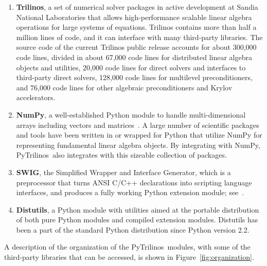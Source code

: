 \documentclass[acmtocl]{acmtrans2m}
\newcommand{\PyTrilinos}{{PyTrilinos}}
\begin{document}
\begin{enumerate}

\item {\bf Trilinos}, a set of numerical solver packages in active
  development at Sandia National Laboratories that allows
  high-performance scalable linear algebra operations for large
  systems of equations.  Trilinos contains more than half a million
  lines of code, and it can interface with many third-party libraries.  The
  source code of the current Trilinos public release accounts for
  about 300,000 code lines, divided in about 67,000 code lines for
  distributed linear algebra objects and utilities, 20,000 code lines
  for direct solvers and interfaces to third-party direct solvers,
  128,000 code lines for multilevel preconditioners, and 76,000 code
  lines for other algebraic preconditioners and Krylov accelerators.

\item {\bf NumPy}, a well-established Python module to handle
  multi-dimensional arrays including vectors and
  matrices~\cite{numpy}.  A large number of scientific packages and
  tools have been written in or wrapped for Python that utilize
  NumPy for representing fundamental linear algebra objects.  By
  integrating with NumPy, \PyTrilinos\ also integrates with this
  sizeable collection of packages.

\item {\bf SWIG}, the Simplified Wrapper and Interface Generator,
  which is a preprocessor that turns ANSI C/C++ declarations into
  scripting language interfaces, and produces a fully working Python
  extension module; see~\cite{swig}.

\item {\bf Distutils}, a Python module with utilities aimed at the
  portable distribution of both pure Python modules and compiled
  extension modules.  Distutils has been a part of the standard Python
  distribution since Python version 2.2.

\end{enumerate}

A description of the organization of the \PyTrilinos\ modules, with
some of the third-party libraries that can be accessed, is shown in
Figure~\ref{fig:organization}.
\end{document}
